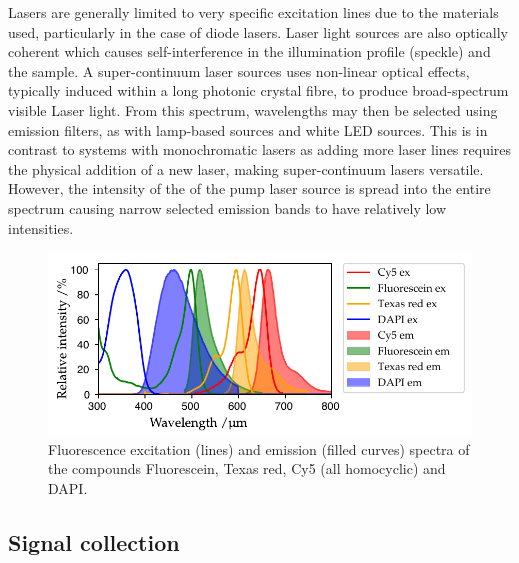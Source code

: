 \Gls{Laser}s are generally limited to very specific excitation lines due to the materials used, particularly in the case of diode lasers.
\Gls{Laser} light sources are also optically \gls{coherent} which causes self-interference in the illumination profile (speckle) and the sample.
A \gls{super-continuum laser} sources uses non-linear optical effects, typically induced within a long photonic crystal fibre, to produce broad-spectrum visible \gls{Laser} light.
From this spectrum, wavelengths may then be selected using emission filters, as with lamp-based sources and white LED sources.
This is in contrast to systems with monochromatic lasers as adding more laser lines requires the physical addition of a new laser, making \gls{super-continuum laser}s versatile.
However, the intensity of the of the pump laser source is spread into the entire spectrum causing narrow selected emission bands to have relatively low intensities.

\begin{figure}
    \centering
    \includegraphics{./fluorphores/++multi_plot.pdf}
    \caption{Fluorescence excitation (lines) and emission (filled curves) spectra of the compounds Fluorescein, Texas red, Cy5 (all homocyclic) and DAPI.}
    \label{fig:fluo_spectra}
\end{figure}

\subsection{Signal collection}

